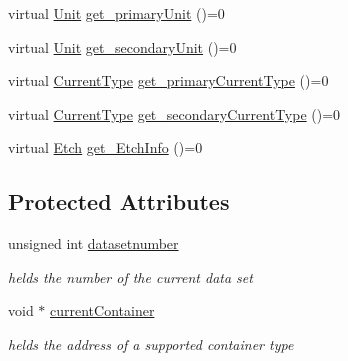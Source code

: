 \begin{DoxyCompactItemize}
virtual \hyperlink{classFluke_1_1Fluke189DataResponseAnalyzerWrapper_ab8e5f2306e4d2ad3d741d273793aaed1}{Unit} \hyperlink{classFluke_1_1Fluke189DataResponseAnalyzerWrapper_a81fd0f497095dba37f2a614bd35426db}{get\_\-primaryUnit} ()=0
\item 
virtual \hyperlink{classFluke_1_1Fluke189DataResponseAnalyzerWrapper_ab8e5f2306e4d2ad3d741d273793aaed1}{Unit} \hyperlink{classFluke_1_1Fluke189DataResponseAnalyzerWrapper_a8c24a1f3d5abae862ffa06a3a7ac44f1}{get\_\-secondaryUnit} ()=0
\item 
virtual \hyperlink{classFluke_1_1Fluke189DataResponseAnalyzerWrapper_afef24496da239e3613c40ad3582d7adc}{CurrentType} \hyperlink{classFluke_1_1Fluke189DataResponseAnalyzerWrapper_afb7361d6963bb0edd9194ba72a1583df}{get\_\-primaryCurrentType} ()=0
\item 
virtual \hyperlink{classFluke_1_1Fluke189DataResponseAnalyzerWrapper_afef24496da239e3613c40ad3582d7adc}{CurrentType} \hyperlink{classFluke_1_1Fluke189DataResponseAnalyzerWrapper_a21a39a54587e31af04c931b46aa11806}{get\_\-secondaryCurrentType} ()=0
\item 
virtual \hyperlink{classFluke_1_1Fluke189DataResponseAnalyzerWrapper_ada71f6ab32a7b0eb40bb0ed96d7053bc}{Etch} \hyperlink{classFluke_1_1Fluke189DataResponseAnalyzerWrapper_a258e56c1ff27b8aae648940599d3b475}{get\_\-EtchInfo} ()=0
\end{DoxyCompactItemize}
\subsection*{Protected Attributes}
\begin{DoxyCompactItemize}
\item 
\hypertarget{classFluke_1_1Fluke189DataResponseAnalyzerWrapper_a568ccec1349cc6b278fb0791182bc7b4}{
unsigned int \hyperlink{classFluke_1_1Fluke189DataResponseAnalyzerWrapper_a568ccec1349cc6b278fb0791182bc7b4}{datasetnumber}}
\label{classFluke_1_1Fluke189DataResponseAnalyzerWrapper_a568ccec1349cc6b278fb0791182bc7b4}

\begin{DoxyCompactList}\small\item\em helds the number of the current data set \item\end{DoxyCompactList}\item 
\hypertarget{classFluke_1_1Fluke189DataResponseAnalyzerWrapper_aa0096243be3694f7993022733703697a}{
void $\ast$ \hyperlink{classFluke_1_1Fluke189DataResponseAnalyzerWrapper_aa0096243be3694f7993022733703697a}{currentContainer}}
\label{classFluke_1_1Fluke189DataResponseAnalyzerWrapper_aa0096243be3694f7993022733703697a}

\begin{DoxyCompactList}\small\item\em helds the address of a supported container type \item\end{DoxyCompactList}\end{DoxyCompactItemize}
